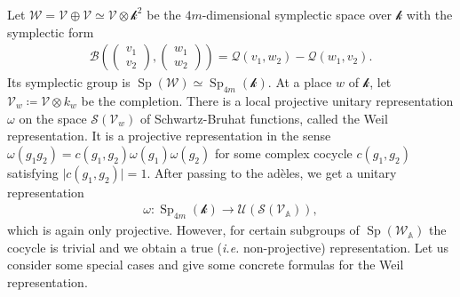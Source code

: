 \documentclass[11pt]{article} %
\newcommand{\8}{\infty}
\newcommand{\kbf}{\mathcal{k}}
\newcommand{\Sp}{\operatorname{Sp}}
\newcommand{\A}{\mathbb{A}}
\newcommand{\Scal}{\mathcal{S}}
\newcommand{\Ucal}{\mathcal{U}}
\newcommand{\Vcal}{\mathcal{V}}
\newcommand{\Wcal}{\mathcal{W}}
\newcommand{\Bcal}{\mathcal{B}}
\newcommand{\Qcal}{\mathcal{Q}}
\theoremstyle{mytheoremstyle}
\theoremstyle{remark}
\numberwithin{equation}{section}
\begin{document}
\subsubsection{} Let $\Wcal=\Vcal \oplus \Vcal \simeq \Vcal \otimes \kbf^2$ be the $4m$-dimensional symplectic space over $\kbf$ with the symplectic form 
\begin{align}
    \Bcal \left (\begin{pmatrix}
        v_1 \\ v_2
    \end{pmatrix},\begin{pmatrix}
        w_1 \\ w_2
    \end{pmatrix} \right )=\Qcal(v_1,w_2)-\Qcal(w_1,v_2).
\end{align} Its symplectic group is $\Sp(\Wcal) \simeq \Sp_{4m}(\kbf)$. At a place $w$ of $\kbf$, let $\Vcal_w \coloneqq \Vcal \otimes k_w$ be the completion. There is a local projective unitary representation $\omega$ on the space $\Scal(\Vcal_w)$ of Schwartz-Bruhat functions, called the Weil representation. It is a projective representation in the sense $\omega(g_1g_2)=c(g_1,g_2)\omega(g_1)\omega(g_2)$ for some complex cocycle $c(g_1,g_2)$ satisfying $\vert c(g_1,g_2) \vert=1$. After passing to the adèles, we get a unitary representation
\begin{align}
    \omega \colon \Sp_{4m}(\kbf) \longrightarrow \Ucal(\Scal(\Vcal_\A)),
\end{align}
which is again only projective. However, for certain subgroups of $\Sp(\Wcal_\A)$ the cocycle is trivial and we obtain a true ({\em i.e.} non-projective) representation. Let us consider some special cases and give some concrete formulas for the Weil representation.
\end{document}
